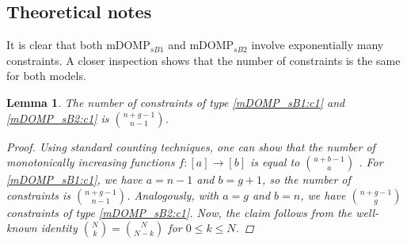\documentclass[letterpaper]{article}
\newtheorem{lemma}[theorem]{Lemma}
\begin{document}
\subsection{Theoretical notes}\label{sec:theoretical_notes}
It is clear that both $\text{mDOMP}_{sB1}$ and $\text{mDOMP}_{sB2}$ involve exponentially many constraints. A closer inspection shows that the number of constraints is the same for both models.
\begin{lemma}\label{lemma_num_constraints}
    The number of constraints of type \eqref{mDOMP_sB1:c1} and \eqref{mDOMP_sB2:c1} is $\binom{n + g - 1}{n - 1}$.
    \begin{proof}
        Using standard counting techniques, one can show that the number of monotonically increasing functions $f: [a] \rightarrow [b]$ is equal to $\binom{a + b - 1}{a}$ \citep[see, e.g.,][]{stanley1997enumerative}. For \eqref{mDOMP_sB1:c1}, we have $a = n-1$ and $b = g+1$, so the number of constraints is $\binom{n + g - 1}{n - 1}$. Analogously, with $a = g$ and $b = n$, we have $\binom{n + g - 1}{g}$ constraints of type \eqref{mDOMP_sB2:c1}. Now, the claim follows from the well-known identity $\binom{N}{k} = \binom{N}{N-k}$ for $0 \leq k \leq N$.
    \end{proof}
\end{lemma}
\end{document}
